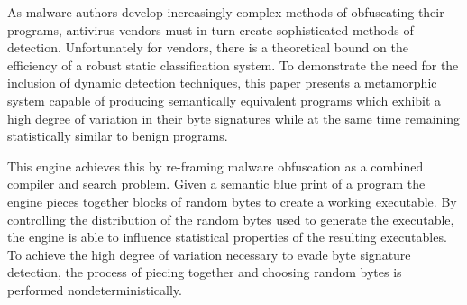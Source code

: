     As malware authors develop increasingly complex methods of obfuscating their
    programs, antivirus vendors must in turn create sophisticated methods of
    detection. Unfortunately for vendors, there is a theoretical bound on the
    efficiency of a robust static classification system\cite{npcomplete}. To
    demonstrate the need for the inclusion of dynamic detection techniques, this
    paper presents a metamorphic system capable of producing semantically
    equivalent programs which exhibit a high degree of variation in their byte
    signatures while at the same time remaining statistically similar to benign
    programs.

    This engine achieves this by re-framing malware obfuscation as a combined
    compiler and search problem. Given a semantic blue print of a program the
    engine pieces together blocks of random bytes to create a working
    executable. By controlling the distribution of the random bytes used to
    generate the executable, the engine is able to influence statistical
    properties of the resulting executables. To achieve the high degree of
    variation necessary to evade byte signature detection, the process of
    piecing together and choosing random bytes is performed
    nondeterministically.


